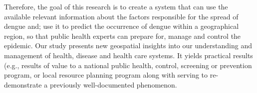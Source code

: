 \documentclass{bmcart}
\begin{document}

Therefore, the goal of this research is to create a system that can use the available relevant information about the factors responsible for the spread of dengue and; use it to predict the occurrence of dengue within a geographical region, so that public health experts can prepare for, manage and control the epidemic. Our study presents new geospatial insights into our understanding and management of health, disease and health care systems. It yields practical results (e.g., results of value to a national public health, control, screening or prevention program, or local resource planning program along with serving to re-demonstrate a previously well-documented phenomenon. 




\end{document}
